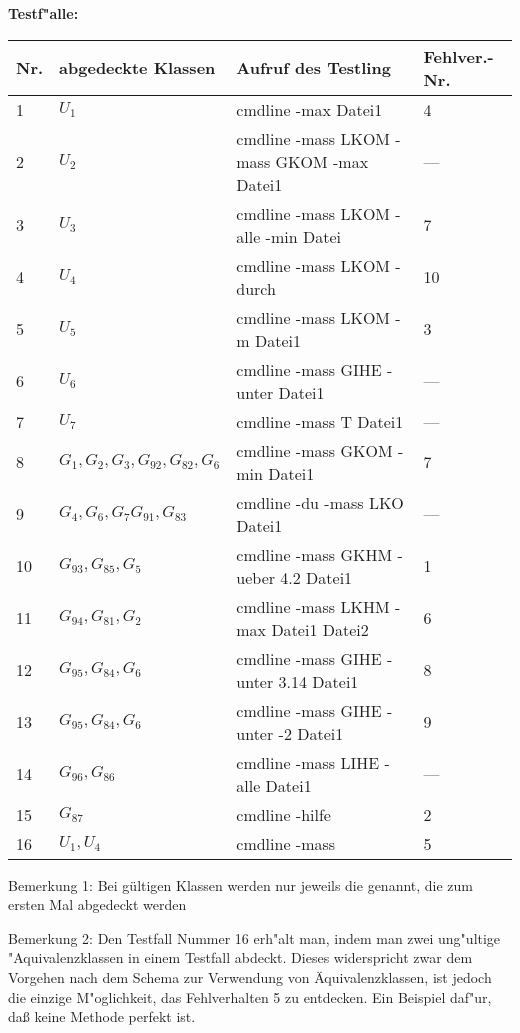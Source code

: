 \medskip
\textbf{Testf"alle:}
\smallskip

\begin{tabular}{l|l|l|l}
Nr. & abgedeckte Klassen  	& Aufruf des Testling 		& Fehlver.-Nr. \\ \hline
1   & $U_1$         		& cmdline -max Datei1                       & 4   \\
2   & $U_2$                     & cmdline -mass LKOM -mass GKOM -max Datei1 & --- \\
3   & $U_3$                     & cmdline -mass LKOM -alle -min Datei       & 7   \\
4   & $U_4$                     & cmdline -mass LKOM -durch                 & 10   \\
5   & $U_5$                     & cmdline -mass LKOM -m Datei1              & 3   \\
6   & $U_6$                     & cmdline -mass GIHE -unter Datei1          & --- \\
7   & $U_7$                     & cmdline -mass T Datei1                    & --- \\
8   & $G_1,G_2,G_3,G_{92},G_{82},G_6$& cmdline -mass GKOM -min  Datei1     & 7   \\
9   & $G_4, G_6, G_7 G_{91}, G_{83}$& cmdline -du -mass LKO Datei1          & --- \\
10  & $G_{93}, G_{85}, G_5$     & cmdline -mass GKHM -ueber 4.2 Datei1    & 1   \\
11  & $G_{94}, G_{81}, G_2$     & cmdline -mass LKHM -max Datei1 Datei2   & 6   \\
12  & $G_{95}, G_{84}, G_6$     & cmdline -mass GIHE -unter 3.14 Datei1   & 8   \\
13  & $G_{95}, G_{84}, G_6$     & cmdline -mass GIHE -unter -2 Datei1     & 9   \\
14  & $G_{96}, G_{86}$          & cmdline -mass LIHE -alle Datei1         & --- \\
15  & $G_{87}$                  & cmdline -hilfe                          & 2   \\
16  & $U_1, U_4$                & cmdline -mass                           & 5   \\
\end{tabular}

\medskip
Bemerkung 1: Bei g\"ultigen Klassen werden nur jeweils die genannt, die
zum ersten Mal abgedeckt werden

\smallskip
Bemerkung 2: Den Testfall Nummer 16 erh"alt man, indem man zwei
ung"ultige "Aquivalenzklassen in einem Testfall abdeckt. Dieses
widerspricht zwar dem Vorgehen nach dem Schema zur Verwendung von
\"Aquivalenzklassen, ist jedoch die einzige M"oglichkeit, das
Fehlverhalten 5 zu entdecken. Ein Beispiel daf"ur, da{\ss} keine Methode
perfekt ist.   

